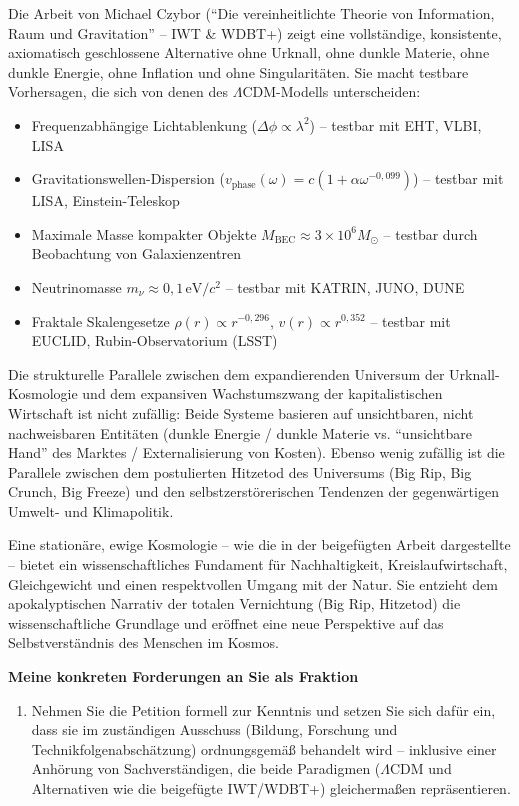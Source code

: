 \documentclass[11pt,a4paper]{letter}
\begin{document}
\begin{letter}
Die Arbeit von Michael Czybor (\enquote{Die vereinheitlichte Theorie von Information, Raum und Gravitation} – IWT \& WDBT+) zeigt eine vollständige, konsistente, axiomatisch geschlossene Alternative ohne Urknall, ohne dunkle Materie, ohne dunkle Energie, ohne Inflation und ohne Singularitäten. Sie macht testbare Vorhersagen, die sich von denen des $\Lambda$CDM-Modells unterscheiden:

\begin{itemize}
    \item Frequenzabhängige Lichtablenkung ($\Delta\phi \propto \lambda^2$) – testbar mit EHT, VLBI, LISA
    \item Gravitationswellen-Dispersion ($v_{\text{phase}}(\omega) = c(1 + \alpha \omega^{-0,099})$) – testbar mit LISA, Einstein-Teleskop
    \item Maximale Masse kompakter Objekte $M_{\text{BEC}} \approx 3 \times 10^6 M_\odot$ – testbar durch Beobachtung von Galaxienzentren
    \item Neutrinomasse $m_\nu \approx 0,1\,\text{eV}/c^2$ – testbar mit KATRIN, JUNO, DUNE
    \item Fraktale Skalengesetze $\rho(r) \propto r^{-0,296}$, $v(r) \propto r^{0,352}$ – testbar mit EUCLID, Rubin-Observatorium (LSST)
\end{itemize}

Die strukturelle Parallele zwischen dem expandierenden Universum der Urknall-Kosmologie und dem expansiven Wachstumszwang der kapitalistischen Wirtschaft ist nicht zufällig: Beide Systeme basieren auf unsichtbaren, nicht nachweisbaren Entitäten (dunkle Energie / dunkle Materie vs. \enquote{unsichtbare Hand} des Marktes / Externalisierung von Kosten). Ebenso wenig zufällig ist die Parallele zwischen dem postulierten Hitzetod des Universums (Big Rip, Big Crunch, Big Freeze) und den selbstzerstörerischen Tendenzen der gegenwärtigen Umwelt- und Klimapolitik.

Eine stationäre, ewige Kosmologie – wie die in der beigefügten Arbeit dargestellte – bietet ein wissenschaftliches Fundament für Nachhaltigkeit, Kreislaufwirtschaft, Gleichgewicht und einen respektvollen Umgang mit der Natur. Sie entzieht dem apokalyptischen Narrativ der totalen Vernichtung (Big Rip, Hitzetod) die wissenschaftliche Grundlage und eröffnet eine neue Perspektive auf das Selbstverständnis des Menschen im Kosmos.

\noindent
\textbf{Meine konkreten Forderungen an Sie als Fraktion}

\begin{enumerate}
    \item Nehmen Sie die Petition formell zur Kenntnis und setzen Sie sich dafür ein, dass sie im zuständigen Ausschuss (Bildung, Forschung und Technikfolgenabschätzung) ordnungsgemäß behandelt wird – inklusive einer Anhörung von Sachverständigen, die beide Paradigmen ($\Lambda$CDM und Alternativen wie die beigefügte IWT/WDBT+) gleichermaßen repräsentieren.
    

\end{enumerate}
\end{letter}
\end{document}
